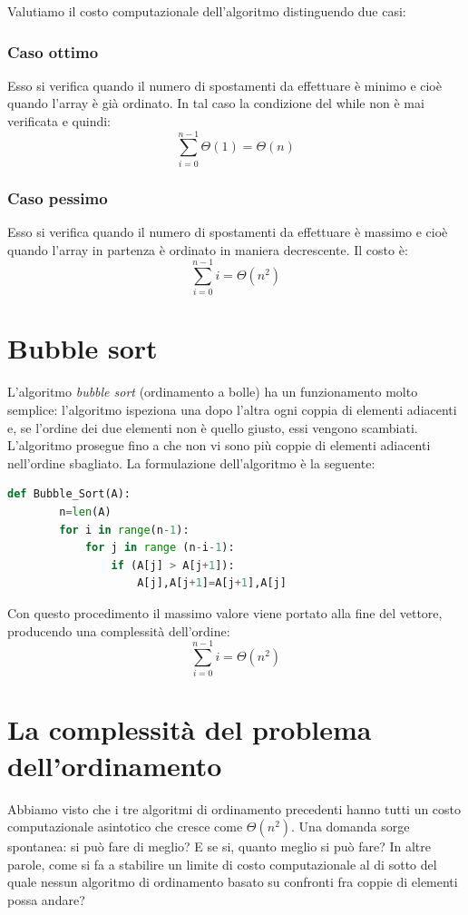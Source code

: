 Valutiamo il costo computazionale dell'algoritmo distinguendo due casi:
\subsubsection{Caso ottimo}
Esso si verifica quando il numero di spostamenti da effettuare è minimo e cioè quando l’array è già ordinato. In tal caso la condizione del while non è mai verificata e quindi:\begin{equation*}\sum^{n-1}_{i=0}\Theta(1)=\Theta(n)\end{equation*}
\subsubsection{Caso pessimo}
Esso si verifica quando il numero di spostamenti da effettuare è massimo e cioè quando l’array in partenza è ordinato in maniera decrescente. Il costo è:\begin{equation*}\sum^{n-1}_{i=0}i=\Theta(n^2)\end{equation*}

\section{Bubble sort}
L’algoritmo \textit{bubble sort} (ordinamento a bolle) ha un funzionamento molto semplice: l’algoritmo ispeziona una dopo l’altra ogni coppia di elementi adiacenti e, se l’ordine dei due elementi non è quello giusto, essi vengono scambiati. L’algoritmo prosegue fino a che non vi sono più coppie di elementi adiacenti nell'ordine sbagliato. La formulazione dell'algoritmo è la seguente:
\begin{lstlisting}[language=Python]
    def Bubble_Sort(A):
        n=len(A)
        for i in range(n-1):
            for j in range (n-i-1):
                if (A[j] > A[j+1]):
                    A[j],A[j+1]=A[j+1],A[j]
\end{lstlisting}
Con questo procedimento il massimo valore viene portato alla fine del vettore, producendo una complessità dell'ordine:
\begin{equation*}
    \sum^{n-1}_{i=0}i=\Theta(n^2)
\end{equation*}


\section*{La complessità del problema dell'ordinamento}
Abbiamo visto che i tre algoritmi di ordinamento precedenti hanno tutti un costo computazionale asintotico che cresce come $\Theta(n^2)$. Una domanda sorge spontanea: si può fare di meglio? E se si, quanto meglio si può fare?
In altre parole, come si fa a stabilire un limite di costo computazionale al di sotto del quale nessun algoritmo di ordinamento basato su confronti fra coppie di elementi possa andare? 

